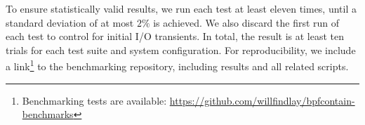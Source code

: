 To ensure statistically valid results, we run each test at least eleven times, until
a standard deviation of at most $2\%$ is achieved. We also discard the first run of each
test to control for initial I/O transients. In total, the result is at least ten trials
for each test suite and system configuration. For reproducibility, we include
a link\footnote{Benchmarking tests are available:
\url{https://github.com/willfindlay/bpfcontain-benchmarks}} to the benchmarking
repository, including results and all related scripts.






